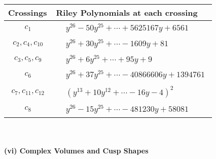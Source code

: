 \documentclass[1p]{elsarticle_modified}
\theoremstyle{definition}
\begin{document}
\begin{tabular}{m{50pt}|m{274pt}}
Crossings & \hspace{64pt}Riley Polynomials at each crossing \\
\hline $$\begin{aligned}c_{1}\end{aligned}$$&$\begin{aligned}
&y^{26}-50 y^{25}+\cdots+5625167 y+6561
\end{aligned}$\\
\hline $$\begin{aligned}c_{2},c_{4},c_{10}\end{aligned}$$&$\begin{aligned}
&y^{26}+30 y^{25}+\cdots-1609 y+81
\end{aligned}$\\
\hline $$\begin{aligned}c_{3},c_{5},c_{9}\end{aligned}$$&$\begin{aligned}
&y^{26}+6 y^{25}+\cdots+95 y+9
\end{aligned}$\\
\hline $$\begin{aligned}c_{6}\end{aligned}$$&$\begin{aligned}
&y^{26}+37 y^{25}+\cdots-40866606 y+1394761
\end{aligned}$\\
\hline $$\begin{aligned}c_{7},c_{11},c_{12}\end{aligned}$$&$\begin{aligned}
&(y^{13}+10 y^{12}+\cdots-16 y-4)^{2}
\end{aligned}$\\
\hline $$\begin{aligned}c_{8}\end{aligned}$$&$\begin{aligned}
&y^{26}-15 y^{25}+\cdots-481230 y+58081
\end{aligned}$\\
\hline
\end{tabular}\\~\\
\newpage\flushleft \textbf{(vi) Complex Volumes and Cusp Shapes}
\end{document}
